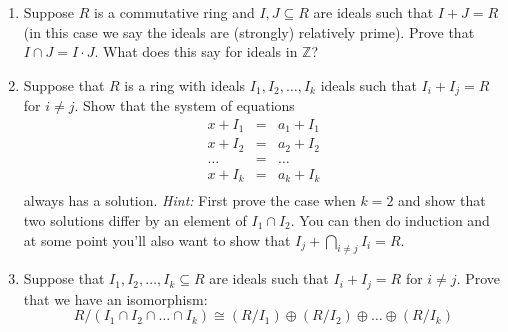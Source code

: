 \documentclass[11pt]{amsart}
\newcommand{\bZ}{\mathbb{Z}}
\begin{document}
\begin{enumerate}
\[\begin{array}{c}
            I \cap (J + K) = I \cap J + I \cap K
        \end{array}
    \]
    \newpage
    \item Suppose $R$ is a commutative ring and $I, J \subseteq R$ are ideals such that $I + J = R$ (in this case we say the ideals are (strongly) relatively prime).  Prove that $I \cap J = I \cdot J$.  What does this say for ideals in $\bZ$?
    \newpage
    \item Suppose that $R$ is a ring with ideals $I_1, I_2, \dots, I_k$ ideals such that $I_i + I_j = R$ for $i \neq j$.  Show that the system of equations 
    \[
        \begin{array}{rcl}
            x + I_1 & = & a_1 + I_1 \\
            x + I_2 & = & a_2 + I_2 \\
            \dots & = & \dots \\
            x+ I_k & = & a_k + I_k\\
        \end{array}
    \]
    always has a solution.  \vskip 3pt
    \emph{Hint:} First prove the case when $k = 2$ and show that two solutions differ by an element of $I_1 \cap I_2$.  You can then do induction and at some point you'll also want to show that $I_j + \bigcap_{i \neq j} I_i = R$.  
    \newpage
    \item Suppose that $I_1, I_2, \dots, I_k \subseteq R$ are ideals such that $I_i + I_j = R$ for $i \neq j$.  Prove that we have an isomorphism:
        \[
            R/(I_1 \cap I_2 \cap \dots \cap I_k) \cong (R/I_1) \oplus (R/I_2) \oplus \dots \oplus (R/I_k)
        \]        
\end{enumerate}
\end{document}
